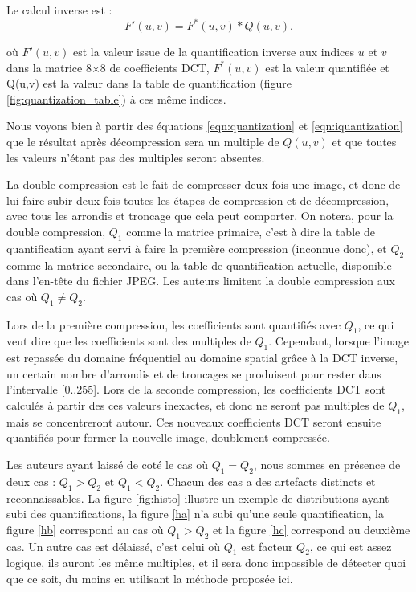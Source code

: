 \documentclass[utf8,final]{stageM2R} %
\begin{document}
Le calcul inverse est :
\begin{equation}
  F'(u,v) = F^*(u,v) * Q(u,v).
  \label{eqn:iquantization}
\end{equation}

où $F'(u,v)$ est la valeur issue de la quantification inverse aux indices $u$ et $v$ dans la matrice 8$\times$8 de coefficients DCT, $F^*(u,v)$ est la valeur quantifiée et Q(u,v) est la valeur dans la table de quantification (figure \ref{fig:quantization_table}) à ces même indices.

Nous voyons bien à partir des équations \ref{eqn:quantization} et \ref{eqn:iquantization} que le résultat après décompression sera un multiple de $Q(u,v)$ et que toutes les valeurs n'étant pas des multiples seront absentes.

La double compression est le fait de compresser deux fois une image, et donc de lui faire subir deux fois toutes les étapes de compression et de décompression, avec tous les arrondis et troncage que cela peut comporter. On notera, pour la double compression, $Q_{1}$ comme la matrice primaire, c'est à dire la table de quantification ayant servi à faire la première compression (inconnue donc), et $Q_{2}$ comme la matrice secondaire, ou la table de quantification actuelle, disponible dans l'en-tête du fichier JPEG. Les auteurs limitent la double compression aux cas où $Q_{1} \neq Q_{2}$.

Lors de la première compression, les coefficients sont quantifiés avec $Q_{1}$, ce qui veut dire que les coefficients sont des multiples de $Q_{1}$. Cependant, lorsque l'image est repassée du domaine fréquentiel au domaine spatial grâce à la DCT inverse, un certain nombre d'arrondis et de troncages se produisent pour rester dans l'intervalle [0..255]. Lors de la seconde compression, les coefficients DCT sont calculés à partir des ces valeurs inexactes, et donc ne seront pas multiples de $Q_{1}$, mais se concentreront autour. Ces nouveaux coefficients DCT seront ensuite quantifiés pour former la nouvelle image, doublement compressée.

Les auteurs ayant laissé de coté le cas où $Q_{1} = Q_{2}$, nous sommes en présence de deux cas : $Q_{1} > Q_{2}$ et $Q_{1} < Q_{2}$. Chacun des cas a des artefacts distincts et reconnaissables. La figure \ref{fig:histo} illustre un exemple de distributions ayant subi des quantifications, la figure \ref{ha} n'a subi qu'une seule quantification, la figure \ref{hb} correspond au cas où $Q_{1} > Q_{2}$ et la figure \ref{hc} correspond au deuxième cas. Un autre cas est délaissé, c'est celui où $Q_{1}$ est facteur $Q_{2}$, ce qui est assez logique, ils auront les même multiples, et il sera donc impossible de détecter quoi que ce soit, du moins en utilisant la méthode proposée ici.
\end{document}
